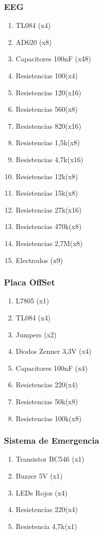 \documentclass{article}
\begin{document}
\subsubsection{EEG}
\begin{enumerate}
    \item TL084 (x4)
    \item AD620 (x8)
    \item Capacitores 100nF (x48)
    \item Resistencias 100\Ω (x4)
    \item Resistencias 120\Ω (x16)
    \item Resistencias 560\Ω (x8) 
    \item Resistencias 820\Ω (x16)
    \item Resistencias 1,5k\Ω (x8)
    \item Resistencias 4,7k\Ω (x16)
    \item Resistencias 12k\Ω (x8)
    \item Resistencias 15k\Ω (x8)
    \item Resistencias 27k\Ω (x16)
    \item Resistencias 470k\Ω (x8)
    \item Resistencias 2,7M\Ω (x8)
    \item Electrodos (x9)
\end{enumerate}

\subsubsection{Placa OffSet}
\begin{enumerate}
    \item L7805 (x1)
    \item TL084 (x4)
    \item Jumpers (x2)
    \item Diodos Zenner 3,3V (x4)
    \item Capacitores 100nF (x4)
    \item Resistencias 220\Ω (x4)
    \item Resistencias 50k\Ω (x8)
    \item Resistencias 100k\Ω (x8)
\end{enumerate}

\subsubsection{Sistema de Emergencia}
\begin{enumerate}
    \item Transistor BC546 (x1)
    \item Buzzer 5V (x1)
    \item LEDs Rojos (x4)
    \item Resistencias 220\Ω (x4)
    \item Resistencia 4,7k\Ω (x1)
\end{enumerate}
\end{document}
